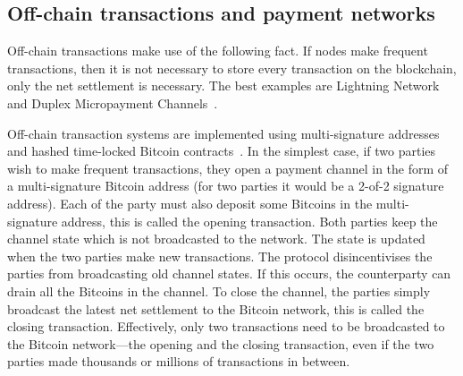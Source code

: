 

\subsection{Off-chain transactions and payment networks}
Off-chain transactions make use of the following fact.
If nodes make frequent transactions,
then it is not necessary to store every transaction on the blockchain,
only the net settlement is necessary.
The best examples are Lightning Network~\cite{lightningnetwork} and Duplex Micropayment Channels~\cite{decker2015fast}.

Off-chain transaction systems are implemented using multi-signature addresses~\cite{bitcoinmultisig} and hashed time-locked Bitcoin contracts~\cite{bitcointimelock}.
In the simplest case, 
if two parties wish to make frequent transactions,
they open a payment channel in the form of a multi-signature Bitcoin address (for two parties it would be a 2-of-2 signature address).
Each of the party must also deposit some Bitcoins in the multi-signature address,
this is called the opening transaction.
Both parties keep the channel state which is not broadcasted to the network.
The state is updated when the two parties make new transactions.
The protocol disincentivises the parties from broadcasting old channel states.
If this occurs, the counterparty can drain all the Bitcoins in the channel.
To close the channel, the parties simply broadcast the latest net settlement to the Bitcoin network,
this is called the closing transaction.
Effectively, only two transactions need to be broadcasted to the Bitcoin network---the opening and the closing transaction,
even if the two parties made thousands or millions of transactions in between.

